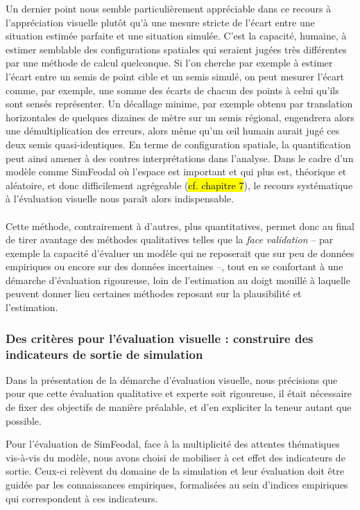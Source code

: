 Un dernier point nous semble particulièrement appréciable dans ce recours à l'appréciation visuelle plutôt qu'à une mesure stricte de l'écart entre une situation estimée parfaite et une situation simulée.
C'est la capacité, humaine, à estimer semblable des configurations spatiales qui seraient jugées très différentes par une méthode de calcul quelconque.
Si l'on cherche par exemple à estimer l'écart entre un semis de point cible et un semis simulé, on peut mesurer l'écart comme, par exemple, une somme des écarts de chacun des points à celui qu'ils sont sensés représenter.
Un décallage minime, par exemple obtenu par translation horizontales de quelques dizaines de mètre sur un semis régional, engendrera alors une démultiplication des erreurs, alors même qu'un œil humain aurait jugé ces deux semis quasi-identiques.
En terme de configuration spatiale, la quantification peut ainsi amener à des contres interprétations dans l'analyse.
Dans le cadre d'un modèle comme SimFeodal où l'espace est important et qui plus est, théorique et aléatoire, et donc difficilement agrégeable (\hl{cf. chapitre 7}), le recours systématique à l'évaluation visuelle nous paraît alors indispensable.

\paragraph*{}Cette méthode, contrairement à d'autres, plus quantitatives, permet donc au final de tirer avantage des méthodes qualitatives telles que la \textit{face validation} -- par exemple la capacité d'évaluer un modèle qui ne reposerait que sur peu de données empiriques ou encore sur des données incertaines --, tout en se confortant à une démarche d'évaluation rigoureuse, loin de l'estimation \og au doigt mouillé\fg{} à laquelle peuvent donner lieu certaines méthodes reposant sur la plausibilité et l'estimation.

\subsubsection{Des critères pour l'évaluation visuelle : construire des indicateurs de sortie de simulation}

Dans la présentation de la démarche d'évaluation visuelle, nous précisions que pour que cette évaluation qualitative et experte soit rigoureuse, il était nécessaire de fixer des objectifs de manière préalable, et d'en expliciter la teneur autant que possible.

Pour l'évaluation de SimFeodal, face à la multiplicité des attentes thématiques vis-à-vis du modèle, nous avons choisi de mobiliser à cet effet des \og indicateurs de sortie\fg{}.
Ceux-ci relèvent du domaine de la simulation et leur évaluation doit être guidée par les connaissances empiriques, formalisées au sein d'\og indices empiriques\fg{} qui correspondent à ces indicateurs.

